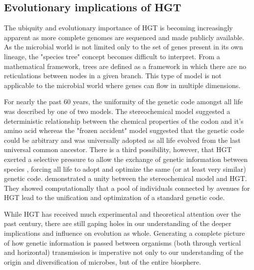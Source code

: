 \subsection*{Evolutionary implications of HGT}

The ubiquity and evolutionary importance of HGT is becoming increasingly
apparent as more complete genomes are sequenced and made publicly available. As
the microbial world is not limited only to the set of genes present in its own
lineage, the "species tree" concept becomes difficult to interpret. From a
mathematical framework, trees are defined as a framework in which there are no
reticulations between nodes in a given branch. This type of model is not
applicable to the microbial world where genes can flow in multiple dimensions.

For nearly the past 60 years, the uniformity of the
genetic code amongst all life was described by one of two models. The
stereochemical model suggested a deterministic relationship between the chemical
properties of the codon and it's amino acid \cite{Grafstein:1983wv} whereas the
"frozen accident" model suggested that the genetic code could be arbitrary and
was universally adopted as all life evolved from the last universal common
ancestor\cite{Crick:1968wg}. There is a third possibility, however, that HGT
exerted a selective pressure to allow the exchange of genetic information
between species \cite{Syvanen:1985vv, Syvanen:2012jn}, forcing all life to adopt
and optimize the same (or at least very similar) genetic
code.\citet{Vestigian:2006va} demonstrated a unity between the stereochemical model
and HGT. They showed computationally that a pool of individuals connected by
avenues for HGT lead to the unification and optimization of a standard genetic
code. 

While HGT has received much experimental and theoretical attention over the past
century, there are still gaping holes in our understanding of the deeper
implications and influence on evolution as whole. Generating a complete picture
of how genetic information is passed between organisms (both through vertical
and horizontal) transmission is imperative not only to our understanding of the
origin and diversification of microbes, but of the entire biosphere.


